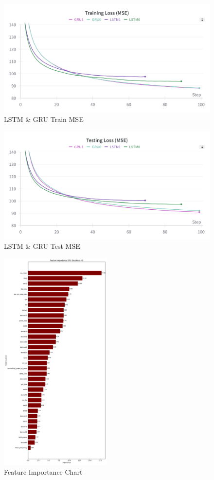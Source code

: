 \begin{figure}[h]
    \centering
    \includegraphics[width=0.4\linewidth]{images/results/LSTM_GRU_Train_mse}
    \caption{LSTM \& GRU Train MSE}
    \label{fig:train_mse}
\end{figure}

\begin{figure}[h]
    \centering
    \includegraphics[width=0.4\linewidth]{images/results/LSTM_GRU_Test_mse}
    \caption{LSTM \& GRU Test MSE}
    \label{fig:test_mse}
\end{figure}

\begin{figure}[h]
    \centering
    \includegraphics[width=0.5\textwidth]{images/results/feature_importance_plot_GRU_0}
    \caption{Feature Importance Chart}
    \label{fig:feat_importance}
\end{figure}
